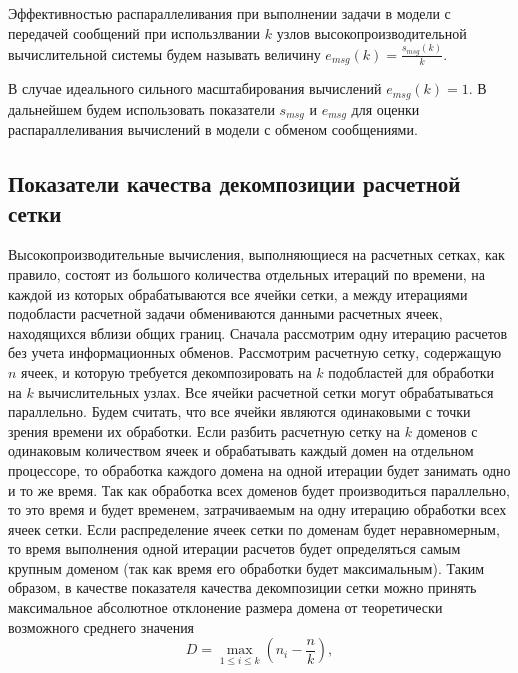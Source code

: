 \begin{definition}
Эффективностью распараллеливания при выполнении задачи в модели с передачей сообщений\label{term:msg_eff} при использлвании $k$ узлов высокопроизводительной вычислительной системы будем называть величину $e_{msg}(k) = \frac{s_{msg}(k)}{k}$.
\end{definition}

В случае идеального сильного масштабирования вычислений $e_{msg}(k) = 1$.
В дальнейшем будем использовать показатели $s_{msg}$ и $e_{msg}$ для оценки распараллеливания вычислений в модели с обменом сообщениями.


\subsection{Показатели качества декомпозиции расчетной сетки}

Высокопроизводительные вычисления, выполняющиеся на расчетных сетках, как правило, состоят из большого количества отдельных итераций по времени, на каждой из которых обрабатываются все ячейки сетки, а между итерациями подобласти расчетной задачи обмениваются данными расчетных ячеек, находящихся вблизи общих границ.
Сначала рассмотрим одну итерацию расчетов без учета информационных обменов.
Рассмотрим расчетную сетку, содержащую $n$ ячеек, и которую требуется декомпозировать на $k$ подобластей для обработки на $k$ вычислительных узлах.
Все ячейки расчетной сетки могут обрабатываться параллельно.
Будем считать, что все ячейки являются одинаковыми с точки зрения времени их обработки.
Если разбить расчетную сетку на $k$ доменов с одинаковым количеством ячеек и обрабатывать каждый домен на отдельном процессоре, то обработка каждого домена на одной итерации будет занимать одно и то же время.
Так как обработка всех доменов будет производиться параллельно, то это время и будет временем, затрачиваемым на одну итерацию обработки всех ячеек сетки.
Если распределение ячеек сетки по доменам будет неравномерным, то время выполнения одной итерации расчетов будет определяться самым крупным доменом (так как время его обработки будет максимальным).
Таким образом, в качестве показателя качества декомпозиции сетки можно принять максимальное абсолютное отклонение размера домена от теоретически возможного среднего значения
\begin{equation}
	D = \max_{1 \le i \le k}{ \left( n_i - \frac{n}{k} \right) },
\end{equation}
 
